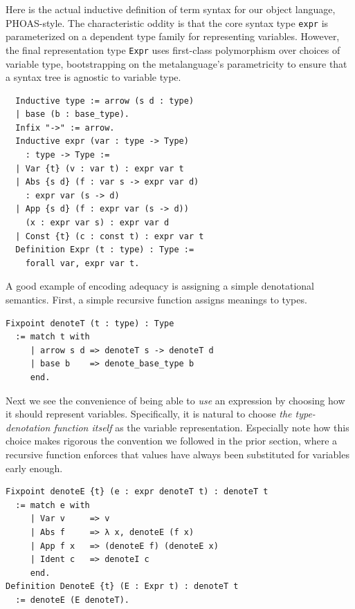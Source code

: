 Here is the actual inductive definition of term syntax for our object language, PHOAS-style.
The characteristic oddity is that the core syntax type \texttt{expr} is parameterized on a dependent type family for representing variables.
However, the final representation type \texttt{Expr} uses first-class polymorphism over choices of variable type, bootstrapping on the metalanguage's parametricity to ensure that a syntax tree is agnostic to variable type.
\begin{verbatim}
  Inductive type := arrow (s d : type)
  | base (b : base_type).
  Infix "->" := arrow.
  Inductive expr (var : type -> Type)
    : type -> Type :=
  | Var {t} (v : var t) : expr var t
  | Abs {s d} (f : var s -> expr var d)
    : expr var (s -> d)
  | App {s d} (f : expr var (s -> d))
    (x : expr var s) : expr var d
  | Const {t} (c : const t) : expr var t
  Definition Expr (t : type) : Type :=
    forall var, expr var t.
\end{verbatim}

A good example of encoding adequacy is assigning a simple denotational semantics.
First, a simple recursive function assigns meanings to types.
\begin{verbatim}
Fixpoint denoteT (t : type) : Type
  := match t with
     | arrow s d => denoteT s -> denoteT d
     | base b    => denote_base_type b
     end.
\end{verbatim}

Next we see the convenience of being able to \emph{use} an expression by choosing how it should represent variables.
Specifically, it is natural to choose \emph{the type-denotation function itself} as the variable representation.
Especially note how this choice makes rigorous the convention we followed in the prior section, where a recursive function enforces that values have always been substituted for variables early enough.
\begin{verbatim}
Fixpoint denoteE {t} (e : expr denoteT t) : denoteT t
  := match e with
     | Var v     => v
     | Abs f     => λ x, denoteE (f x)
     | App f x   => (denoteE f) (denoteE x)
     | Ident c   => denoteI c
     end.
Definition DenoteE {t} (E : Expr t) : denoteT t
  := denoteE (E denoteT).
\end{verbatim}

